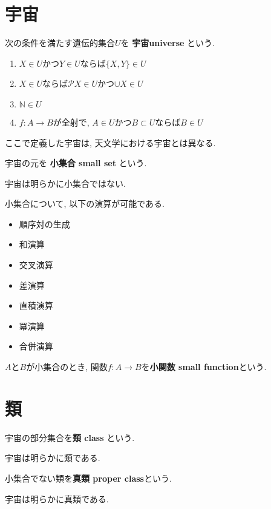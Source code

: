 \section{宇宙}
\begin{Def}
次の条件を満たす遺伝的集合$U$を
{\bf 宇宙universe}
という.
\begin{enumerate}
\item $X\in U$かつ$Y\in U$ならば$\{X,Y\}\in U$
\item $X\in U$ならば$ \mathcal{P}X\in U$かつ$\cup X\in U$
\item $\mathbb{N}\in U$
\item $f:A\rightarrow B$が全射で, $A\in U$かつ$ B\subset U$ならば$B \in U$
\end{enumerate}
\end{Def}
\begin{caution}
ここで定義した宇宙は, 天文学における宇宙とは異なる.
\end{caution}
\begin{Def}
宇宙の元を
{\bf 小集合 small set}
という.
\end{Def}
\begin{caution}
宇宙は明らかに小集合ではない.
\end{caution}
\begin{Prop}
小集合について, 以下の演算が可能である.
\begin{itemize}
\item 順序対の生成
\item 和演算
\item 交叉演算
\item 差演算
\item 直積演算
\item 冪演算
\item 合併演算
\end{itemize}
\end{Prop}
\begin{Def}
$A$と$B$が小集合のとき, 関数$f:A\rightarrow B$を{\bf 小関数 small function}という.
\end{Def}

\section{類}
\begin{Def}
宇宙の部分集合を{\bf 類 class} という.
\end{Def}
\begin{caution}
宇宙は明らかに類である.
\end{caution}
\begin{Def}
小集合でない類を{\bf 真類 proper class}という.
\end{Def}
\begin{caution}
宇宙は明らかに真類である.
\end{caution}


